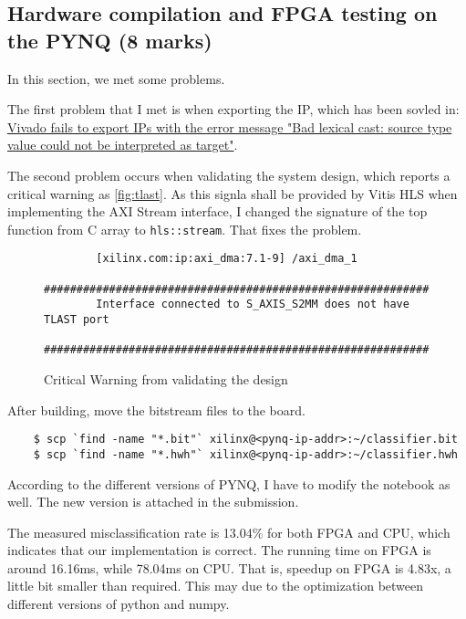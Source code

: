 \subsection{Hardware compilation and FPGA testing on the PYNQ (8 marks)}\label{sec:1f}

In this section, we met some problems.

The first problem that I met is when exporting the IP, which has been sovled in: \href{https://support.xilinx.com/s/question/0D52E00006uxy49SAA/vivado-fails-to-export-ips-with-the-error-message-bad-lexical-cast-source-type-value-could-not-be-interpreted-as-target}{Vivado fails to export IPs with the error message "Bad lexical cast: source type value could not be interpreted as target"}.

The second problem occurs when validating the system design, which reports a critical warning as \autoref{fig:tlast}.
As this signla shall be provided by Vitis HLS when implementing the AXI Stream interface, I changed the signature of the top function from C array to \texttt{hls::stream}.
That fixes the problem.

\begin{figure}
    \begin{verbatim}
        [xilinx.com:ip:axi_dma:7.1-9] /axi_dma_1
        ###########################################################
        Interface connected to S_AXIS_S2MM does not have TLAST port
        ###########################################################
    \end{verbatim}
    \caption{Critical Warning from validating the design}
    \label{fig:tlast}
\end{figure}

After building, move the bitstream files to the board.

\begin{verbatim}
    $ scp `find -name "*.bit"` xilinx@<pynq-ip-addr>:~/classifier.bit
    $ scp `find -name "*.hwh"` xilinx@<pynq-ip-addr>:~/classifier.hwh
\end{verbatim}

According to the different versions of PYNQ, I have to modify the notebook as well.
The new version is attached in the submission.

The measured misclassification rate is 13.04\% for both FPGA and CPU, which indicates that our implementation is correct.
The running time on FPGA is around 16.16ms, while 78.04ms on CPU.
That is, speedup on FPGA is 4.83x, a little bit smaller than required.
This may due to the optimization between different versions of python and numpy.
